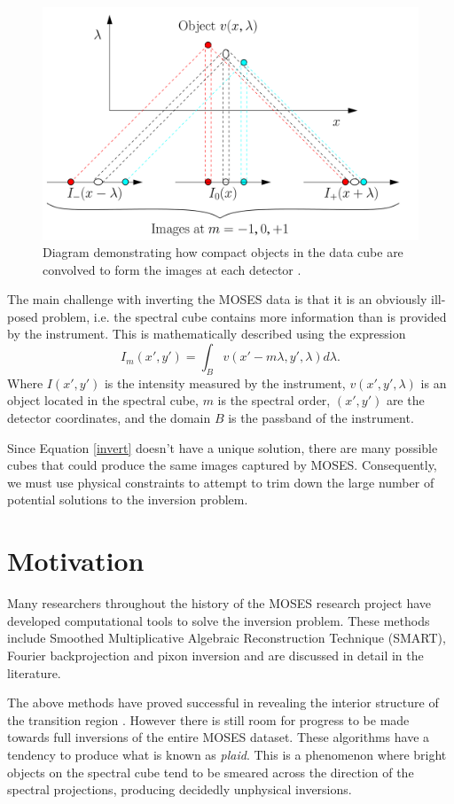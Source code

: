 \documentclass[twoside]{article}
\begin{document}
\begin{multicols}{2}
\begin{figure}[H]
	\includegraphics[width=\linewidth]{images/inversion}
	\caption{Diagram demonstrating how compact objects in the data cube are convolved to form the images at each detector \cite{moses}.}
	\label{inversion}
\end{figure}
The main challenge with inverting the MOSES data is that it is an obviously ill-posed problem, i.e. the spectral cube contains more information than is provided by the instrument. This is mathematically described using the expression
\begin{equation}
I_m(x',y') = \int_B v(x'-m \lambda,y',\lambda)d\lambda. \label{invert}
\end{equation}
Where $I(x',y')$ is the intensity measured by the instrument, $v(x',y',\lambda)$ is an object located in the spectral cube, $m$ is the spectral order, $(x',y')$ are the detector coordinates, and the domain $B$ is the passband of the instrument. 
\par Since Equation \eqref{invert} doesn't have a unique solution, there are many possible cubes that could produce the same images captured by MOSES. Consequently, we must use physical constraints to attempt to trim down the large number of potential solutions to the inversion problem. \par 

\section{Motivation}

Many researchers throughout the history of the MOSES research project have developed computational tools to solve the inversion problem. These methods include Smoothed Multiplicative Algebraic Reconstruction Technique (SMART)\cite{smart}, Fourier backprojection and pixon inversion \cite{inversion} and are discussed in detail in the literature. 
\par The above methods have proved successful in revealing the interior structure of the transition region \cite{moses}. However there is still room for progress to be made towards full inversions of the entire MOSES dataset. These algorithms have a tendency to produce what is known as \textit{plaid}. This is a phenomenon where bright objects on the spectral cube tend to be smeared across the direction of the spectral projections, producing decidedly unphysical inversions.


\end{multicols}
\end{document}

